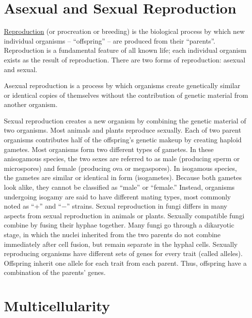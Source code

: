 \section{Asexual and Sexual
Reproduction}\label{asexual-and-sexual-reproduction}

\href{https://en.wikipedia.org/wiki/Reproduction}{Reproduction} (or
procreation or breeding) is the biological process by which new
individual organisms -- ``offspring'' -- are produced from their
``parents''. Reproduction is a fundamental feature of all known life;
each individual organism exists as the result of reproduction. There are
two forms of reproduction: asexual and sexual.

Asexual reproduction is a process by which organisms create genetically
similar or identical copies of themselves without the contribution of
genetic material from another organism.

Sexual reproduction creates a new organism by combining the genetic
material of two organisms. Most animals and plants reproduce sexually.
Each of two parent organisms contributes half of the offspring's genetic
makeup by creating haploid gametes. Most organisms form two different
types of gametes. In these anisogamous species, the two sexes are
referred to as male (producing sperm or microspores) and female
(producing ova or megaspores). In isogamous species, the gametes are
similar or identical in form (isogametes). Because both gametes look
alike, they cannot be classified as ``male'' or ``female.'' Instead,
organisms undergoing isogamy are said to have different mating types,
most commonly noted as ``+'' and ``−'' strains. Sexual reproduction in
fungi differs in many aspects from sexual reproduction in animals or
plants. Sexually compatible fungi combine by fusing their hyphae
together. Many fungi go through a dikaryotic stage, in which the nuclei
inherited from the two parents do not combine immediately after cell
fusion, but remain separate in the hyphal cells. Sexually reproducing
organisms have different sets of genes for every trait (called alleles).
Offspring inherit one allele for each trait from each parent. Thus,
offspring have a combination of the parents' genes.

\section{Multicellularity}\label{multicellularity}

